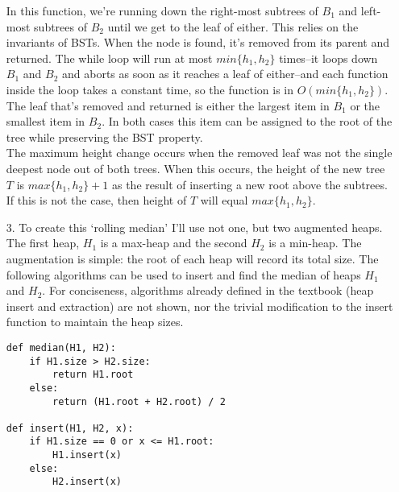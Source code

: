 \documentclass{article}
\begin{document}
\begin{enumerate}
    In this function, we're running down the right-most subtrees of $B_1$ and left-most subtrees of $B_2$ until we get to the leaf of either. This relies on the invariants of BSTs. When the node is found, it's removed from its parent and returned. The while loop will run at most $min\{h_1, h_2\}$ times--it loops down $B_1$ and $B_2$ and aborts as soon as it reaches a leaf of either--and each function inside the loop takes a constant time, so the function is in $O(min\{h_1, h_2\})$. \\

    The leaf that's removed and returned is either the largest item in $B_1$ or the smallest item in $B_2$. In both cases this item can be assigned to the root of the tree while preserving the BST property. \\

    The maximum height change occurs when the removed leaf was not the single deepest node out of both trees. When this occurs, the height of the new tree $T$ is $max\{h_1, h_2\} + 1$ as the result of inserting a new root above the subtrees. If this is not the case, then height of $T$ will equal $max\{h_1, h_2\}$.

\item [3.] To create this `rolling median' I'll use not one, but two augmented heaps. The first heap, $H_1$ is a max-heap and the second $H_2$ is a min-heap. The augmentation is simple: the root of each heap will record its total size. The following algorithms can be used to insert and find the median of heaps $H_1$ and $H_2$. For conciseness, algorithms already defined in the textbook (heap insert and extraction) are not shown, nor the trivial modification to the insert function to maintain the heap sizes.
\begin{lstlisting}
def median(H1, H2):
    if H1.size > H2.size:
        return H1.root
    else:
        return (H1.root + H2.root) / 2

def insert(H1, H2, x):
    if H1.size == 0 or x <= H1.root:
        H1.insert(x)
    else:
        H2.insert(x)


\end{lstlisting}
\end{enumerate}
\end{document}
